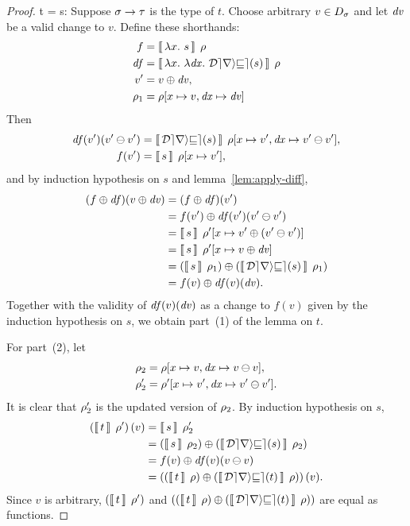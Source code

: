 \begin{proof}
\Case t =  s:%
Suppose $\sigma\to\tau$ is the type of $t$. Choose arbitrary $v\in
D_\sigma$ and let $\mathit{dv}$ be a valid change to $v$. Define these
shorthands:
\begin{align*}
f     & = \mean[\Gr]{\Lam{x} s} \\
\D f  & = \mean[\Gr]{\Lam{x}{\Lam{\D x}{\Derive s}}} \\
v'    & = \Apply{\D v}v,\\
\Gr_1 & = \Gr[x\mapsto v,\D x\mapsto\D v]
\end{align*}
Then
\begin{align*}
\D f(v')(\Diff{v'}{v'})
& = \mean[\Gr[x\mapsto v',\D x\mapsto\Diff{v'}{v'}]]{\Derive
s},\\
f(v')
& = \mean[\Gr[x\mapsto v']]s,
\end{align*}
and by induction hypothesis on $s$ and lemma~\ref{lem:apply-diff},
\begin{align*}
(\Apply{\D f}f)(\Apply{\D v}v)
& = (\Apply{\D f}f)(v')\\
& = \Apply{\D f(v')(\Diff{v'}{v'})}{f(v')}\\
& = \mean[\Gr'[x\mapsto\Apply{\Diff*{v'}{v'}}{v'}]]{s}\\
& = \mean[\Gr'[x\mapsto\Apply{\D v}{v}]]s\\
& = \Apply{\mean*[\Gr_1]{\Derive s}}
          {\mean*[\Gr_1]s}\\
& = \Apply{\D f(v)(\D v)}{f(v)}.
\end{align*}
Together with the validity of $\mathit{df}(v)(\mathit{dv})$ as a change to
$f(v)$ given by the induction hypothesis on $s$, we obtain
part~(1) of the lemma on $t$.

For part~(2), let
\begin{align*}
\Gr_2  & = \Gr[x\mapsto v,\D x\mapsto \Diff vv],\\
\Gr_2' & = \Gr'[x\mapsto v',\D x\mapsto \Diff{v'}{v'}].
\end{align*}
It is clear that $\rho_2'$ is the updated version of $\rho_2$. By
induction hypothesis on $s$,
\begin{align*}
\mean*[\Gr']t(v)
& = \mean[\Gr_2']s\\
& = \Apply{\mean*[\Gr_2]{\Derive s}}{\mean*[\Gr_2]s}\\
& = \Apply{\D f(v)(\Diff vv)}{f(v)}\\
& = \Apply*{\mean*[\Gr]{\Derive t}}{\mean*[\Gr]t}(v).
\end{align*}
Since $v$ is arbitrary, $\mean*[\Gr']t$ and
$\Apply*{\mean*[\Gr]{\Derive t}}{\mean*[\Gr]t}$ are equal as
functions.
\end{proof}

